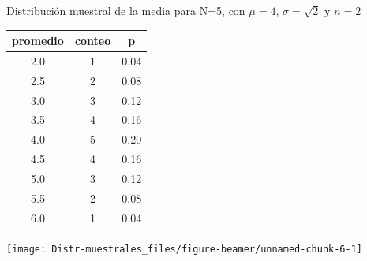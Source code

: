 \documentclass[
  10pt,
  ignorenonframetext,
]{beamer}
\begin{document}
\begin{frame}{}
\protect\hypertarget{section-17}{}
\begin{block}{Distribución muestral de la media para N=5, con \(\mu=4\),
\(\sigma=\sqrt{2}\) y \(n=2\)}
\protect\hypertarget{distribuciuxf3n-muestral-de-la-media-para-n5-con-mu4-sigmasqrt2-y-n2}{}
\begin{minipage}{\textwidth}

\begin{multicols}{2}


\begin{tabular}{c|c|c}
\hline
promedio & conteo & p\\
\hline
2.0 & 1 & 0.04\\
\hline
2.5 & 2 & 0.08\\
\hline
3.0 & 3 & 0.12\\
\hline
3.5 & 4 & 0.16\\
\hline
4.0 & 5 & 0.20\\
\hline
4.5 & 4 & 0.16\\
\hline
5.0 & 3 & 0.12\\
\hline
5.5 & 2 & 0.08\\
\hline
6.0 & 1 & 0.04\\
\hline
\end{tabular}



\begin{flushright}\texttt{[image: Distr-muestrales\_files/figure-beamer/unnamed-chunk-6-1]} \end{flushright}



\end{multicols}

\end{minipage}
\end{block}
\end{frame}
\end{document}

